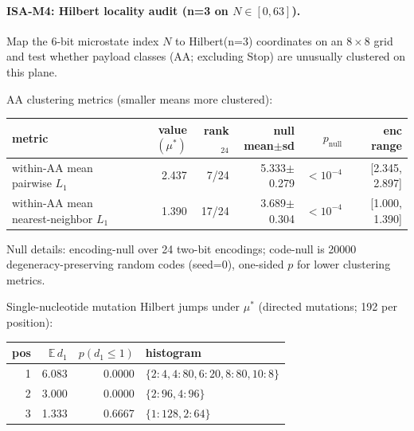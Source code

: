 \paragraph{ISA-M4: Hilbert locality audit (n=3 on $N\in[0,63]$).}
Map the 6-bit microstate index $N$ to Hilbert(n=3) coordinates on an $8\times 8$ grid and test whether payload classes (AA; excluding Stop) are unusually clustered on this plane.

\noindent AA clustering metrics (smaller means more clustered):
\begin{center}
\scriptsize
\setlength{\tabcolsep}{6pt}
\renewcommand{\arraystretch}{1.10}
\begin{tabular}{l r r r r r}
\toprule
metric & value $(\mu^\ast)$ & rank$_{24}$ & null mean$\pm$sd & $p_{\mathrm{null}}$ & enc range \\
\midrule
within-AA mean pairwise $L_1$ & 2.437 & 7/24 & 5.333$\pm$0.279 & $<10^{-4}$ & [2.345, 2.897] \\
within-AA mean nearest-neighbor $L_1$ & 1.390 & 17/24 & 3.689$\pm$0.304 & $<10^{-4}$ & [1.000, 1.390] \\
\bottomrule
\end{tabular}
\end{center}
\noindent Null details: encoding-null over 24 two-bit encodings; code-null is 20000 degeneracy-preserving random codes (seed=0), one-sided $p$ for lower clustering metrics.

\noindent Single-nucleotide mutation Hilbert jumps under $\mu^\ast$ (directed mutations; 192 per position):
\begin{center}
\scriptsize
\setlength{\tabcolsep}{6pt}
\renewcommand{\arraystretch}{1.10}
\begin{tabular}{r r r l}
\toprule
pos & $\mathbb{E}\,d_1$ & $p(d_1\le 1)$ & histogram \\
\midrule
1 & 6.083 & 0.0000 & $\{2:4, 4:80, 6:20, 8:80, 10:8\}$ \\
2 & 3.000 & 0.0000 & $\{2:96, 4:96\}$ \\
3 & 1.333 & 0.6667 & $\{1:128, 2:64\}$ \\
\bottomrule
\end{tabular}
\end{center}

